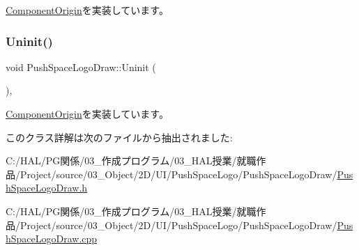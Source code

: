 \mbox{\hyperlink{class_component_origin_a9f674891257f2272b1636d8b6bb05d81}{Component\+Origin}}を実装しています。

\mbox{\label{class_push_space_logo_draw_a79021c1df43968d6008de74126d53fba}} 
\subsubsection{\texorpdfstring{Uninit()}{Uninit()}}
{\footnotesize\ttfamily void Push\+Space\+Logo\+Draw\+::\+Uninit (\begin{DoxyParamCaption}{ }\end{DoxyParamCaption})\hspace{0.3cm}{\ttfamily [override]}, {\ttfamily [virtual]}}



\mbox{\hyperlink{class_component_origin_a9f89a93f9c1954bd53f9750e35e6089d}{Component\+Origin}}を実装しています。



このクラス詳解は次のファイルから抽出されました\+:\begin{DoxyCompactItemize}
\item 
C\+:/\+H\+A\+L/\+P\+G関係/03\+\_\+作成プログラム/03\+\_\+\+H\+A\+L授業/就職作品/\+Project/source/03\+\_\+\+Object/2\+D/\+U\+I/\+Push\+Space\+Logo/\+Push\+Space\+Logo\+Draw/\mbox{\hyperlink{_push_space_logo_draw_8h}{Push\+Space\+Logo\+Draw.\+h}}\item 
C\+:/\+H\+A\+L/\+P\+G関係/03\+\_\+作成プログラム/03\+\_\+\+H\+A\+L授業/就職作品/\+Project/source/03\+\_\+\+Object/2\+D/\+U\+I/\+Push\+Space\+Logo/\+Push\+Space\+Logo\+Draw/\mbox{\hyperlink{_push_space_logo_draw_8cpp}{Push\+Space\+Logo\+Draw.\+cpp}}\end{DoxyCompactItemize}
